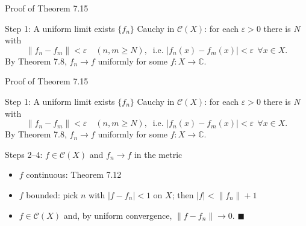 \documentclass[aspectratio=169,12pt,t]{beamer}
\begin{document}
{%
\begin{frame}{Proof of Theorem 7.15}
  \begin{proofblock}{Step 1: A uniform limit exists}
    $\{f_n\}$ Cauchy in $\mathscr{C}(X)$: for each $\varepsilon > 0$ there is $N$ with
    \[
      \|f_n - f_m\| < \varepsilon \quad (n, m \geq N),
      \ \text{ i.e. } |f_n(x) - f_m(x)| < \varepsilon \ \ \forall x \in X.
    \]
    By Theorem 7.8, $f_n \to f$ \alert{uniformly} for some $f : X \to \mathbb{C}$.
  \end{proofblock}

\end{frame}

\begin{frame}{Proof of Theorem 7.15}
  \begin{proofblock}{Step 1: A uniform limit exists}
    $\{f_n\}$ Cauchy in $\mathscr{C}(X)$: for each $\varepsilon > 0$ there is $N$ with
    \[
      \|f_n - f_m\| < \varepsilon \quad (n, m \geq N),
      \ \text{ i.e. } |f_n(x) - f_m(x)| < \varepsilon \ \ \forall x \in X.
    \]
    By Theorem 7.8, $f_n \to f$ \alert{uniformly} for some $f : X \to \mathbb{C}$.
  \end{proofblock}
  \begin{proofblock}{Steps 2--4: $f \in \mathscr{C}(X)$ and $f_n \to f$ in the metric}
    \begin{itemize}
      \item $f$ \alert{continuous}: Theorem 7.12
      \item $f$ \alert{bounded}: pick $n$ with $|f - f_n| < 1$ on $X$; then
        $|f| < \|f_n\| + 1$
      \item $f \in \mathscr{C}(X)$ and, by uniform convergence, $\|f - f_n\| \to 0$.
        \hfill $\blacksquare$
    \end{itemize}
  \end{proofblock}


\end{frame}}
\end{document}
